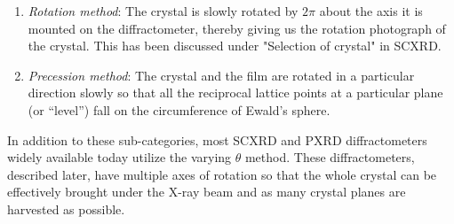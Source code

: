 \begin{itemize}
\begin{enumerate}
		    \item \textit{Rotation method}: The crystal is slowly rotated by $2\pi$ about the axis it is mounted on the diffractometer, thereby giving us the rotation photograph of the crystal. This has been discussed under "Selection of crystal" in SCXRD.
		    
		    \item \textit{Precession method}: The crystal and the film are rotated in a particular direction slowly so that all the reciprocal lattice points at a particular plane (or ``level'') fall on the circumference of Ewald's sphere.
		    
		\end{enumerate}
		
	In addition to these sub-categories, most SCXRD and PXRD diffractometers widely available today utilize the varying $\theta$ method. These diffractometers, described later, have multiple axes of rotation so that the whole crystal can be effectively brought under the X-ray beam and as many crystal planes are harvested as possible.
	    
	\end{itemize}
